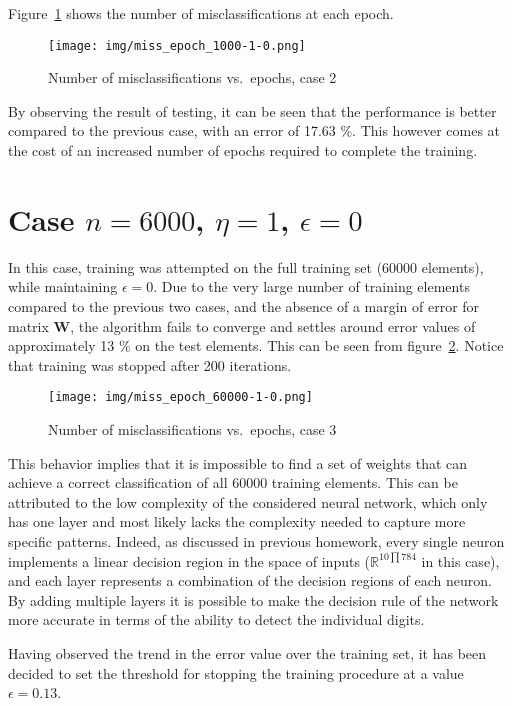 \documentclass[12pt]{article}
\begin{document}
Figure\ \ref{fig:1000_1_0} shows the number of misclassifications at each epoch.

\begin{figure}[ht]
  \centering
  \texttt{[image: img/miss\_epoch\_1000-1-0.png]}
  \caption{Number of misclassifications vs.\ epochs, case 2}
  \label{fig:1000_1_0}
\end{figure}

By observing the result of testing, it can be seen that the performance is better compared to the previous case, with an error of 17.63 \%.
This however comes at the cost of an increased number of epochs required to complete the training.

\section{Case $n=6000$, $\eta=1$, $\epsilon=0$}

In this case, training was attempted on the full training set (60000 elements), while maintaining $\epsilon=0$.
Due to the very large number of training elements compared to the previous two cases, and the absence of a margin of error for matrix $\textbf{W}$, the algorithm fails to converge and settles around error values of approximately 13 \% on the test elements.
This can be seen from figure\ \ref{fig:60000_1_0}. 
Notice that training was stopped after 200 iterations.

\begin{figure}[ht]
  \centering
  \texttt{[image: img/miss\_epoch\_60000-1-0.png]}
  \caption{Number of misclassifications vs.\ epochs, case 3}
  \label{fig:60000_1_0}
\end{figure}

This behavior implies that it is impossible to find a set of weights that can achieve a correct classification of all 60000 training elements.
This can be attributed to the low complexity of the considered neural network, which only has one layer and most likely lacks the complexity needed to capture more specific patterns.
Indeed, as discussed in previous homework, every single neuron implements a linear decision region in the space of inputs ($\mathbb{R}^{10 \prod 784}$ in this case), and each layer represents a combination of the decision regions of each neuron.
By adding multiple layers it is possible to make the decision rule of the network more accurate in terms of the ability to detect the individual digits.

Having observed the trend in the error value over the training set, it has been decided to set the threshold for stopping the training procedure at a value $\epsilon = 0.13$.
\end{document}
